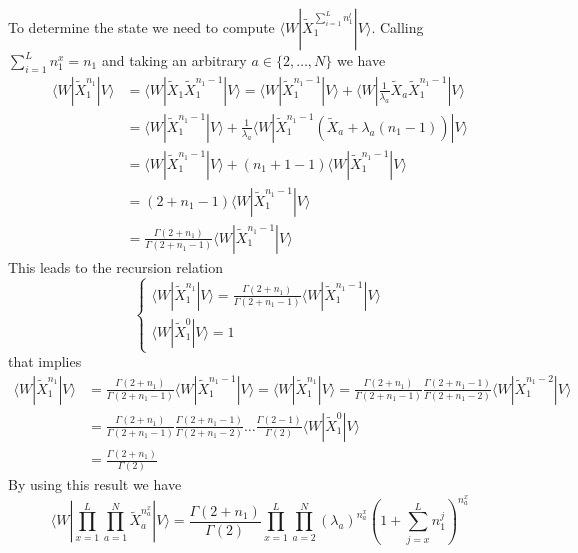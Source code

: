 \documentclass[11pt]{article}
\numberwithin{equation}{section}
\numberwithin{equation}{subsection}
\begin{document}
To determine the state we need to compute $\langle W|\widetilde{X}_{1}^{\sum_{i=1}^{L}n_{1}^{l}}|V\rangle$. Calling $\sum_{i=1}^{L}n_{1}^{x}=n_{1}$ and taking an arbitrary $a\in \{2,\ldots,N\}$ we have
\begin{align*}
	\langle W|\widetilde{X}_{1}^{n_{1}}|V\rangle&=\langle W|\widetilde{X}_{1}\widetilde{X}_{1}^{n_{1}-1}|V\rangle=\langle W|\widetilde{X}_{1}^{n_{1}-1}|V\rangle +\langle W|\frac{1}{\lambda_{a}}\widetilde{X}_{a}\widetilde{X}_{1}^{n_{1}-1}|V\rangle
	\\&=
	\langle W|\widetilde{X}_{1}^{n_{1}-1}|V\rangle+\frac{1}{\lambda_{a}}\langle W|\widetilde{X}_{1}^{n_{1}-1}\left(\widetilde{X}_{a}+\lambda_{a}(n_{1}-1)\right)|V\rangle
	\\&=
	\langle W|\widetilde{X}_{1}^{n_{1}-1}|V\rangle+\left(n_{1}+1-1\right)\langle W|\widetilde{X}_{1}^{n_{1}-1}|V\rangle
	\\&=
	\left(2+n_{1}-1\right)\langle W|\widetilde{X}_{1}^{n_{1}-1}|V\rangle
	\\&=
	\frac{\Gamma(2+n_{1})}{\Gamma(2+n_{1}-1)}\langle W|\widetilde{X}_{1}^{n_{1}-1}|V\rangle
\end{align*}
This leads to the recursion relation
\begin{equation}
	\begin{cases}
		\langle W|\widetilde{X}_{1}^{n_{1}}|V\rangle=\frac{\Gamma(2+n_{1})}{\Gamma(2+n_{1}-1)}\langle W|\widetilde{X}_{1}^{n_{1}-1}|V\rangle\\
		\langle W|\widetilde{X}_{1}^{0}|V\rangle=1
	\end{cases}
\end{equation}
that implies 
\begin{align*}
	\langle W|\widetilde{X}_{1}^{n_{1}}|V\rangle&=\frac{\Gamma(2+n_{1})}{\Gamma(2+n_{1}-1)}\langle W|\widetilde{X}_{1}^{n_{1}-1}|V\rangle=\langle W|\widetilde{X}_{1}^{n_{1}}|V\rangle=\frac{\Gamma(2+n_{1})}{\Gamma(2+n_{1}-1)}\frac{\Gamma(2+n_{1}-1)}{\Gamma(2+n_{1}-2)}\langle W|\widetilde{X}_{1}^{n_{1}-2}|V\rangle\\&=
	\frac{\Gamma(2+n_{1})}{\Gamma(2+n_{1}-1)}\frac{\Gamma(2+n_{1}-1)}{\Gamma(2+n_{1}-2)}\ldots \frac{\Gamma(2-1)}{\Gamma(2)}\langle W|\widetilde{X}_{1}^{0}|V\rangle
	\\&=
	\frac{\Gamma(2+n_{1})}{\Gamma(2)}
\end{align*}
By using this result we have 
\begin{equation}
	\langle W|\prod_{x=1}^{L}\prod_{a=1}^{N}\widetilde{X}_{a}^{n_{a}^{x}}
	|V \rangle=\frac{\Gamma(2+n_{1})}{\Gamma(2)}\prod_{x=1}^{L}\prod_{a=2}^{N}\left(\lambda_{a}\right)^{n_{a}^{x}}\left(1+\sum_{j=x}^{L}n_{1}^{j}\right)^{n_{a}^{x}}
\end{equation}
\end{document}
